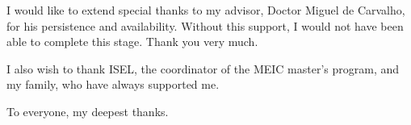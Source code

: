 \acknowledgements

I would like to extend special thanks to my advisor, Doctor Miguel de Carvalho, for his persistence and availability. Without this support, I would not have been able to complete this stage. Thank you very much.

I also wish to thank ISEL, the coordinator of the MEIC master's program, and my family, who have always supported me.

To everyone, my deepest thanks.